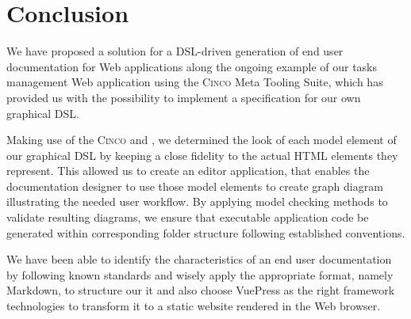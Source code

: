 \chapter{Conclusion}\label{ch:concl}

We have proposed a solution for a DSL-driven generation of end user documentation for Web applications along the ongoing example of our tasks management Web application using the \textsc{Cinco} Meta Tooling Suite, which has provided us with the possibility to implement a specification for our own graphical DSL.

Making use of the \textsc{Cinco}  and , we determined the look of each model element of our graphical DSL by keeping a close fidelity to the actual HTML elements they represent. This allowed us to create an editor application, that enables the documentation designer to use those model elements to create graph diagram illustrating the needed user workflow. By applying model checking methods to validate resulting diagrams, we ensure that executable application code be generated within corresponding folder structure following established conventions.

We have been able to identify the characteristics of an end user documentation by following known standards and wisely apply the appropriate format, namely Markdown, to structure our it and also choose VuePress as the right framework technologies to transform it to a static website rendered in the Web browser.